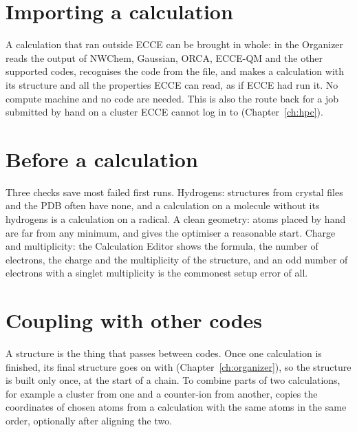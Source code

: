 \section{Importing a calculation}
A calculation that ran outside ECCE can be brought in whole:  in the Organizer reads the output of NWChem, Gaussian, ORCA, ECCE-QM and the other supported codes, recognises the code from the file, and makes a calculation with its structure and all the properties ECCE can read, as if ECCE had run it. No compute machine and no code are needed. This is also the route back for a job submitted by hand on a cluster ECCE cannot log in to (Chapter~\ref{ch:hpc}).

\section{Before a calculation}
Three checks save most failed first runs. Hydrogens: structures from crystal files and the PDB often have none, and a calculation on a molecule without its hydrogens is a calculation on a radical. A clean geometry: atoms placed by hand are far from any minimum, and  gives the optimiser a reasonable start. Charge and multiplicity: the Calculation Editor shows the formula, the number of electrons, the charge and the multiplicity of the structure, and an odd number of electrons with a singlet multiplicity is the commonest setup error of all.

\section{Coupling with other codes}
A structure is the thing that passes between codes. Once one calculation is finished, its final structure goes on with  (Chapter~\ref{ch:organizer}), so the structure is built only once, at the start of a chain. To combine parts of two calculations, for example a cluster from one and a counter-ion from another,  copies the coordinates of chosen atoms from a calculation with the same atoms in the same order, optionally after aligning the two.
